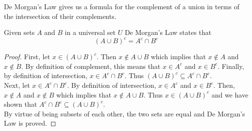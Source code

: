 \documentclass[handout]{ximera}
\begin{document}
De Morgan's Law gives us a formula for the complement of a union in terms of the intersection of their complements.

\begin{proposition}
Given sets $A$ and $B$ in a universal set $U$ De Morgan's Law states that
\[
\left(A \cup B\right)^c = A^c \cap B^c
\]
\end{proposition}

\begin{proof}
First, let $x \in (A \cup B)^c$.  Then  $x \notin A \cup B$ which implies that $x \notin A$ and $x \notin B$. 
By definition of complement, this means that $x \in A^c$ and $x \in B^c$.   
Finally, by definition of intersection, $x \in A^c \cap B^c$.
Thus $(A \cup B)^c \subseteq A^c \cap B^c$.\\
Next, let $x \in A^c \cap B^c$. By definition of intersection, $x \in A^c$ and $x \in B^c$. 
Then, $x \notin A$ and $x \notin B$ which implies that $x \notin A \cup B$. Thus $x \in (A \cup B)^c$ and 
we have shown that  $A^c \cap B^c\subseteq (A \cup B)^c $.\\
By virtue of being subsets of each other, the two sets are equal and De Morgan's Law is proved.
\end{proof}
\end{document}
